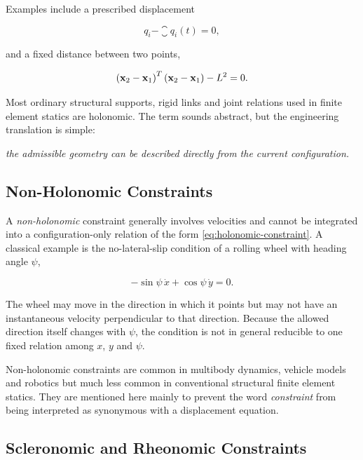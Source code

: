 Examples include a prescribed displacement

\begin{equation}
    q_i-\closure{q}_i(t)=0,
\end{equation}

and a fixed distance between two points,

\begin{equation}
    \left(\mathbf{x}_2-\mathbf{x}_1\right)^T
    \left(\mathbf{x}_2-\mathbf{x}_1\right)-L^2=0.
\end{equation}

Most ordinary structural supports, rigid links and joint relations used in
finite element statics are holonomic. The term sounds abstract, but the
engineering translation is simple:

\begin{center}
\textit{the admissible geometry can be described directly from the current
configuration.}
\end{center}

\subsection{Non-Holonomic Constraints}

A \textit{non-holonomic} constraint generally involves velocities and cannot be
integrated into a configuration-only relation of the form
\eqref{eq:holonomic-constraint}. A classical example is the no-lateral-slip
condition of a rolling wheel with heading angle $\psi$,

\begin{equation}\label{eq:nonholonomic-wheel}
    -\sin\psi\,\dot{x}
    +\cos\psi\,\dot{y}=0.
\end{equation}

The wheel may move in the direction in which it points but may not have an
instantaneous velocity perpendicular to that direction. Because the allowed
direction itself changes with $\psi$, the condition is not in general reducible
to one fixed relation among $x$, $y$ and $\psi$.

Non-holonomic constraints are common in multibody dynamics, vehicle models and
robotics but much less common in conventional structural finite element statics.
They are mentioned here mainly to prevent the word \textit{constraint} from
being interpreted as synonymous with a displacement equation.

\subsection{Scleronomic and Rheonomic Constraints}

